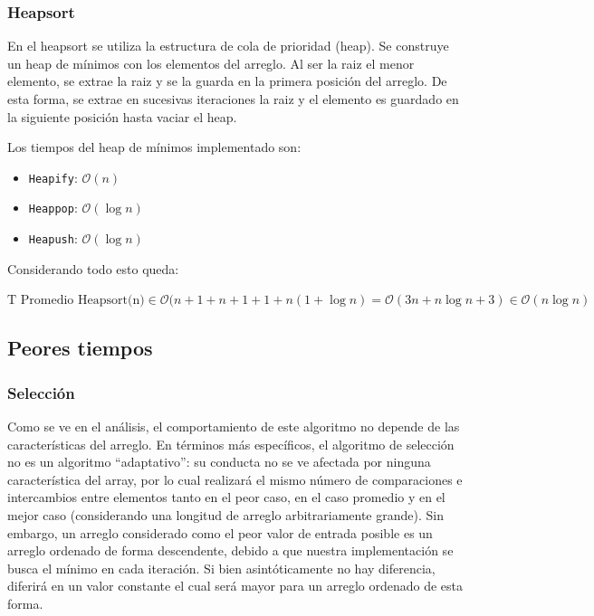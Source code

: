 \documentclass[article,a4paper]{article}
\begin{document}
\subsubsection{Heapsort}

En el heapsort se utiliza la estructura de cola de prioridad (heap). Se construye un heap de mínimos con los elementos del arreglo. Al ser la raiz el menor elemento, se extrae la raiz y se la guarda en la primera posición del arreglo. De esta forma, se extrae en sucesivas iteraciones la raiz y el elemento es guardado en la siguiente posición hasta vaciar el heap.

Los tiempos del heap de mínimos implementado son:

\begin{itemize}
\item \texttt{Heapify}: $\mathcal O(n)$
\item \texttt{Heappop}: $\mathcal O(\log n)$
\item \texttt{Heapush}: $\mathcal O(\log n)$
\end{itemize}

Considerando todo esto queda: 

$\mbox{T Promedio Heapsort(n)} \in \mathcal O(n + 1 + n + 1 + 1 + n (1 + \log n) = \mathcal O(3n + n \log n + 3) \in \mathcal O(n \log n)$ 

\subsection{Peores tiempos}

\subsubsection{Selección}

Como se ve en el análisis, el comportamiento de este algoritmo no depende de las características del arreglo. En términos más específicos, el algoritmo de selección no es un algoritmo “adaptativo”: su conducta no se ve afectada por ninguna característica del array, por lo cual realizará el mismo número de comparaciones e intercambios entre elementos tanto en el peor caso, en el caso promedio y en el mejor caso (considerando una longitud de arreglo arbitrariamente grande). Sin embargo, un arreglo considerado como el peor valor de entrada posible es un arreglo ordenado de forma descendente, debido a que nuestra implementación se busca el mínimo en cada iteración. Si bien asintóticamente no hay diferencia, diferirá en un valor constante el cual será mayor para un arreglo ordenado de esta forma.
\end{document}

